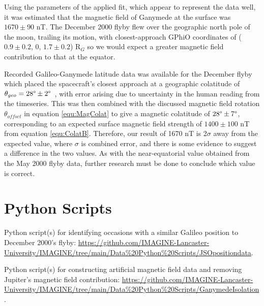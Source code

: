 \documentclass[11pt]{article}
\begin{document}
\noindent Using the parameters of the applied fit, which appear to represent the data well, it was estimated that the magnetic field of Ganymede at the surface was $1670 \pm 90$ nT. The December 2000 flyby flew over the geographic north pole of the moon, trailing its motion, with closest-approach GPhiO coordinates of ($0.9\pm0.2$, 0, $1.7\pm0.2$) R$_{G}$ \cite{flybylines} so we would expect a greater magnetic field contribution to that at the equator. 

Recorded Galileo-Ganymede latitude data was available for the December flyby which placed the spacecraft's closest approach at a geographic colatitude of $\theta_{geo} = 28\degree \pm 2\degree\,$ \cite{amda}, with error arising due to uncertainty in the human reading from the timeseries. This was then combined with the discussed magnetic field rotation $\theta_{offset}$ in equation \ref{equ:MagColat} to give a magnetic colatitude of $28\degree \pm 7\degree$, corresponding to an expected surface magnetic field strength of $1400 \pm 100$ nT from equation \ref{equ:ColatB}. Therefore, our result of 1670 nT is 2$\sigma$ away from the expected value, where $\sigma$ is combined error, and there is some evidence to suggest a difference in the two values. As with the near-equatorial value obtained from the May 2000 flyby data, further research must be done to conclude which value is correct.

\newpage



\newpage
\appendix
\section{Python Scripts}
\label{app:scripts}
Python script(s) for identifying occasions with a similar Galileo position to December 2000's flyby: \url{https://github.com/IMAGINE-Lancaster-University/IMAGINE/tree/main/Data\%20Python\%20Scripts/JSOpositiondata}.

\noindent Python script(s) for constructing artificial magnetic field data and removing Jupiter's magnetic field contribution: \url{https://github.com/IMAGINE-Lancaster-University/IMAGINE/tree/main/Data\%20Python\%20Scripts/GanymedeIsolation}.
\end{document}

